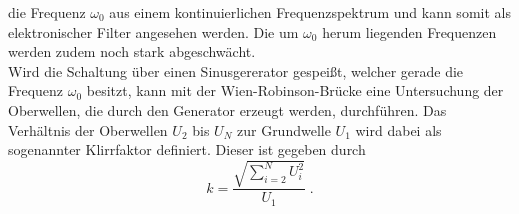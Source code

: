 die Frequenz $\omega_0$ aus einem kontinuierlichen Frequenzspektrum und kann somit als elektronischer Filter angesehen werden. Die um $\omega_0$
herum liegenden Frequenzen werden zudem noch stark abgeschwächt. 
\\\noindent
Wird die Schaltung über einen Sinusgererator gespeißt, welcher gerade die Frequenz $\omega_0$ besitzt, kann mit der Wien-Robinson-Brücke
eine Untersuchung der Oberwellen, die durch den Generator erzeugt werden, durchführen. Das Verhältnis der Oberwellen $U_2$ bis $U_N$ zur 
Grundwelle $U_1$ wird dabei als sogenannter Klirrfaktor definiert. Dieser ist gegeben durch 
\begin{equation}
    k=\frac{\sqrt{\sum_{i=2}^N U_i^2}}{U_1}\;.
\end{equation}

%
